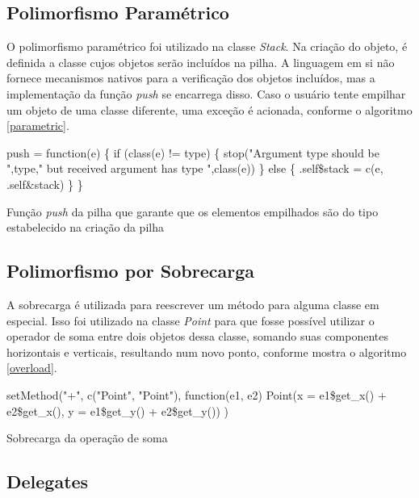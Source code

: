 \documentclass[rel_mlp]{iiufrgs}
\makeatletter
\newcommand{\nosemic}{\renewcommand{\@endalgocfline}{\relax}}%
\makeatother
\begin{document}
\subsection{Polimorfismo Paramétrico}

    O polimorfismo paramétrico foi utilizado na classe \textit{Stack}. Na criação do objeto, é definida
    a classe cujos objetos serão incluídos na pilha. A linguagem em si não fornece mecanismos nativos para
    a verificação dos objetos incluídos, mas a implementação da função \textit{push} se encarrega disso. Caso
    o usuário tente empilhar um objeto de uma classe diferente, uma exceção é acionada, conforme o algoritmo
    \ref{parametric}.

    \begin{algorithm}
    \nosemic    push = function(e) {\{}
  if (class(e) != type) {\{}
    stop("Argument type should be ",type," but received argument has type ",class(e))
  {\}} else {\{}
    .self{\$}stack = c(e, .self{\&}stack)
  {\}}
{\}}
\caption{Função \textit{push} da pilha que garante que os elementos empilhados são do tipo estabelecido na criação da pilha}
\end{algorithm}

    \label{parametric}



\subsection{Polimorfismo por Sobrecarga}

    A sobrecarga é utilizada para reescrever um método para alguma classe em especial. Isso foi utilizado
    na classe \textit{Point} para que fosse possível utilizar o operador de soma entre dois objetos dessa
    classe, somando suas componentes horizontais e verticais, resultando num novo ponto, conforme mostra
    o algoritmo \ref{overload}.

    \begin{algorithm}
    \label{overload}
    \nosemic setMethod("+", c("Point", "Point"), function(e1, e2) {\;
    \nosemic  Point(x = e1{\$}get{\_}x() + e2{\$}get{\_}x(), y = e1{\$}get{\_}y() + e2{\$}get{\_}y())\;
    \nosemic })\;

    \caption{Sobrecarga da operação de soma}
    \end{algorithm}


\subsection{Delegates}
\end{document}
